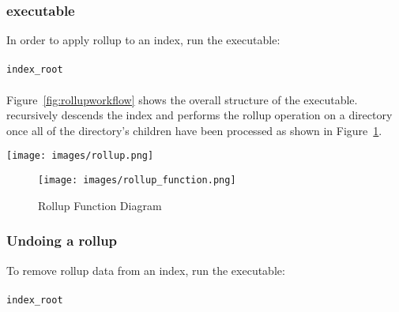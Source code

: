 \subsubsection{\gufirollup executable}
In order to apply rollup to an index, run the \gufirollup executable:
\\\\
\indent \gufirollup \texttt{index\_root}
\\\\
Figure~\ref{fig:rollupworkflow} shows the overall structure of the
\gufirollup executable. \gufirollup recursively descends the index and
performs the rollup operation on a directory once all of the
directory's children have been processed as shown in
Figure~\ref{fig:rollupfunction}.

\begin{sidewaysfigure} [hp]
  \centering \texttt{[image: images/rollup.png]}
  \caption{\gufirollup Workflow}
  \label{fig:rollupworkflow}
\end{sidewaysfigure}

\begin{figure} [hp]
  \centering
  \texttt{[image: images/rollup\_function.png]}
  \caption{Rollup Function Diagram}
  \label{fig:rollupfunction}
\end{figure}

\subsubsection{Undoing a rollup}
To remove rollup data from an index, run the \gufiunrollup executable:
\\\\
\indent \gufiunrollup \texttt{index\_root}

